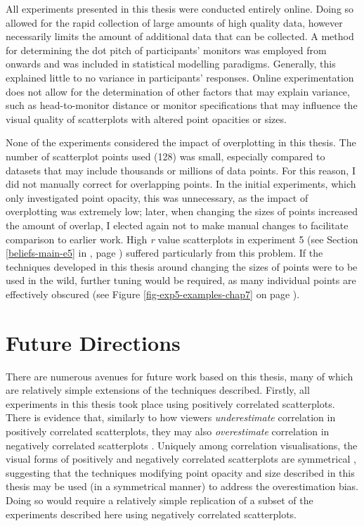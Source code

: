 \documentclass[../main.tex]{subfiles}
\begin{document}
All experiments presented in this thesis were conducted entirely online.
Doing so allowed for the rapid collection of large amounts of high
quality data, however necessarily limits the amount of additional data
that can be collected. A method for determining the dot pitch of
participants' monitors was employed from 
onwards and was included in statistical modelling paradigms. Generally,
this explained little to no variance in participants' responses. Online
experimentation does not allow for the determination of other factors
that may explain variance, such as head-to-monitor distance or monitor
specifications that may influence the visual quality of scatterplots
with altered point opacities or sizes.

None of the experiments considered the impact of overplotting in this
thesis. The number of scatterplot points used (128) was small,
especially compared to datasets that may include thousands or millions
of data points. For this reason, I did not manually correct for
overlapping points. In the initial experiments, which only investigated
point opacity, this was unnecessary, as the impact of overplotting was
extremely low; later, when changing the sizes of points increased the
amount of overlap, I elected again not to make manual changes to
facilitate comparison to earlier work. High \emph{r} value scatterplots
in experiment 5 (see Section \ref{beliefs-main-e5} in
, page \pageref{beliefs-main-e5}) suffered
particularly from this problem. If the techniques developed in this
thesis around changing the sizes of points were to be used in the wild,
further tuning would be required, as many individual points are
effectively obscured (see Figure \ref{fig-exp5-examples-chap7} on page
\pageref{fig-exp5-examples-chap7}).

\section{Future Directions}\label{future-work-chap8}

There are numerous avenues for future work based on this thesis, many of
which are relatively simple extensions of the techniques described.
Firstly, all experiments in this thesis took place using positively
correlated scatterplots. There is evidence that, similarly to how
viewers \emph{underestimate} correlation in positively correlated
scatterplots, they may also \emph{overestimate} correlation in
negatively correlated scatterplots \cite{sher_2017}. Uniquely among
correlation visualisations, the visual forms of positively and
negatively correlated scatterplots are symmetrical \cite{harrison_2014},
suggesting that the techniques modifying point opacity and size
described in this thesis may be used (in a symmetrical manner) to
address the overestimation bias. Doing so would require a relatively
simple replication of a subset of the experiments described here using
negatively correlated scatterplots.
\end{document}
